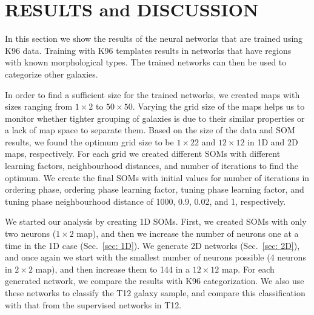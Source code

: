 \section{RESULTS and DISCUSSION}
\label{sec: result}

    In this section we show the results of the neural networks that are trained using K96 data.
    Training with K96 templates results in networks that have regions with known morphological types. 
    The trained networks can then be used to categorize other galaxies.
    
    In order to find a sufficient size for the trained networks, we created maps with sizes ranging from $1\times2$ to $50\times50$.
    Varying the grid size of the maps helps us to monitor whether tighter grouping of galaxies is due to their similar properties or a lack of map space to separate them.
   Based on the size of the data and SOM results, we found the optimum grid size to be $1\times22$ and $12\times12$ in 1D and 2D maps, respectively. 
    For each grid we created different SOMs with different learning factors, neighbourhood distances, and number of iterations to find the optimum.
    We create the final SOMs with initial values for number of iterations in ordering phase, ordering phase learning factor, tuning phase learning factor, and tuning phase neighbourhood distance of 1000, 0.9, 0.02, and 1, respectively.
   
    We started our analysis by creating 1D SOMs. 
    First, we created SOMs with only two neurons ($1\times2$ map), and then we increase the number of neurons one at a time in the 1D case (Sec.~\ref{sec: 1D}).
    We generate 2D networks (Sec.~\ref{sec: 2D}), and once again we start with the smallest number of neurons possible (4 neurons in $2\times2$ map), and then increase them to 144 in a $12\times12$ map.    
    For each generated network, we compare the results with K96 categorization.
    We also use these networks to classify the T12 galaxy sample, and compare this classification with that from the supervised networks in T12.

